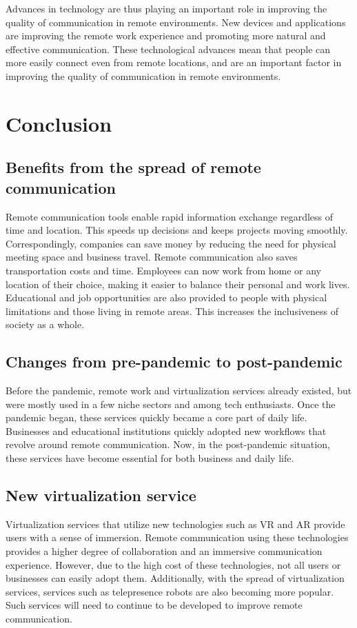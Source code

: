 \documentclass[12pt]{article}
\begin{document}
Advances in technology are thus playing an important role in improving the
quality of communication in remote environments. New devices and applications
are improving the remote work experience and promoting more natural and
effective communication. These technological advances mean that people can more
easily connect even from remote locations, and are an important factor in
improving the quality of communication in remote environments.

\section{Conclusion}
\subsection{Benefits from the spread of remote communication}
Remote communication tools enable rapid information exchange regardless of
time and location. This speeds up decisions and keeps projects moving smoothly.
Correspondingly, companies can save money by reducing the need for physical
meeting space and business travel. Remote communication also saves
transportation costs and time. Employees can now work from home or any location
of their choice, making it easier to balance their personal and work lives.
Educational and job opportunities are also provided to people with physical
limitations and those living in remote areas. This increases the inclusiveness
of society as a whole.

\subsection{Changes from pre-pandemic to post-pandemic}
Before the pandemic, remote work and virtualization services already existed,
but were mostly used in a few niche sectors and among tech enthusiasts. Once
the pandemic began, these services quickly became a core part of daily life.
Businesses and educational institutions quickly adopted new workflows that
revolve around remote communication. Now, in the post-pandemic situation, these
services have become essential for both business and daily life.

\subsection{New virtualization service}
Virtualization services that utilize new technologies such as VR and AR provide
users with a sense of immersion. Remote communication using these technologies
provides a higher degree of collaboration and an immersive communication
experience. However, due to the high cost of these technologies, not all users
or businesses can easily adopt them. Additionally, with the spread of
virtualization services, services such as telepresence robots are also becoming
more popular. Such services will need to continue to be developed to improve
remote communication.
\end{document}
